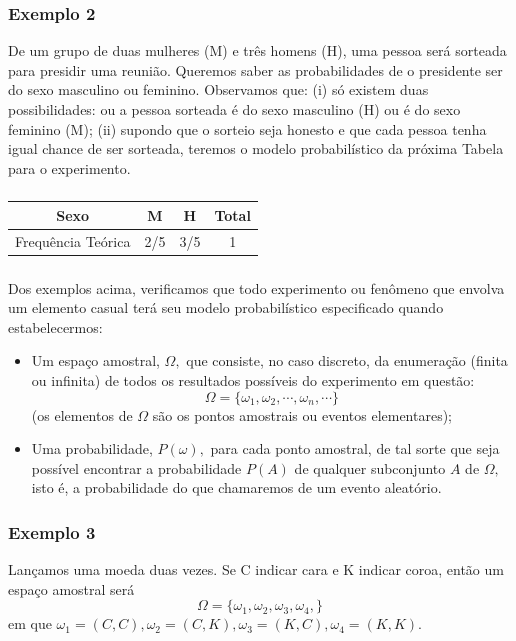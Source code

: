 \documentclass[14pt,aspectratio=1610]{beamer}
\begin{document}
\begin{frame}{}
\frametitle{Exemplo 2}
\begin{block}{}
\justifying
De um grupo de duas mulheres (M) e três homens (H), uma pessoa será sorteada para presidir uma reunião. Queremos saber as probabilidades de o presidente ser do sexo masculino ou feminino. Observamos que: (i) só existem duas possibilidades: ou a pessoa sorteada é do sexo masculino (H) ou é do sexo feminino (M); (ii) supondo que o sorteio seja honesto e que cada pessoa tenha igual chance de ser sorteada, teremos o modelo probabilístico da próxima Tabela para o experimento.
\end{block}
\end{frame}

\begin{frame}{}
\frametitle{}
\begin{block}{}
\centering
\begin{tabular}{c|c|c|c}
\hline
Sexo&M&H&Total\\
\hline
Frequência Teórica&2/5&3/5&1\\
\hline
\end{tabular}
\end{block}
\end{frame}

\begin{frame}{}
\frametitle{}
\small
\begin{block}{}
\justifying
Dos exemplos acima, verificamos que todo experimento ou fenômeno que envolva
um elemento casual terá seu modelo probabilístico especificado quando estabelecermos:
\begin{itemize}
\item \justifying Um espaço amostral, $\Omega,$ que consiste, no caso discreto, da enumeração (finita ou infinita) de todos os resultados possíveis do experimento em questão:
$$\Omega=\{\omega_{1},\omega_{2},\cdots,\omega_{n},\cdots\}$$
(os elementos de $\Omega$ são os pontos amostrais ou eventos elementares);\pause
\item \justifying Uma probabilidade, $P(\omega),$ para cada ponto amostral, de tal sorte que seja possível encontrar a probabilidade $P(A)$ de qualquer subconjunto $A$ de $\Omega,$ isto é, a probabilidade do que chamaremos de um evento aleatório.
\end{itemize}
\end{block}
\end{frame}

\begin{frame}{}
\frametitle{Exemplo 3}
\begin{block}{}
\justifying
Lançamos uma moeda duas vezes. Se C indicar cara e K indicar coroa,
então um espaço amostral será $$\Omega=\{\omega_{1},\omega_{2},\omega_{3},\omega_{4},\}$$
em que $\omega_{1}=(C,C), \omega_{2}=(C,K),\omega_{3}=(K,C), \omega_{4}=(K,K).$ 
\end{block}
\end{frame}
\end{document}

